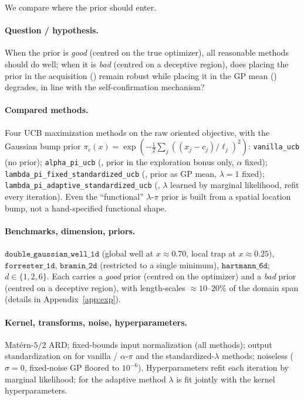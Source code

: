 We compare where the prior should enter. \hfill\Pexp

\paragraph{Question / hypothesis.}
When the prior is \emph{good} (centred on the true optimizer), all reasonable
methods should do well; when it is \emph{bad} (centred on a deceptive region),
does placing the prior in the acquisition (\RIGHT) remain robust while placing it
in the GP mean (\WRONG) degrades, in line with the self-confirmation mechanism?

\paragraph{Compared methods.}
Four UCB maximization methods on the raw oriented objective, with the Gaussian
bump prior $\pi_c(x)=\exp(-\tfrac12\sum_j((x_j-c_j)/\ell_j)^2)$: \texttt{vanilla\_ucb}
(no prior); \texttt{alpha\_pi\_ucb} (\RIGHT, prior in the exploration bonus only,
$\alpha$ fixed); \texttt{lambda\_pi\_fixed\_standardized\_ucb} (\WRONG, prior as
GP mean, $\lambda=1$ fixed); \texttt{lambda\_pi\_adaptive\_standardized\_ucb}
(\WRONG, $\lambda$ learned by marginal likelihood, refit every iteration). Even
the ``functional'' $\lambda$-$\pi$ prior is built from a spatial location bump,
not a hand-specified functional shape.

\paragraph{Benchmarks, dimension, priors.}
$\texttt{double\_gaussian\_well\_1d}$ (global well at $x\approx0.70$, local trap
at $x\approx0.25$), $\texttt{forrester\_1d}$, $\texttt{branin\_2d}$ (restricted
to a single minimum), $\texttt{hartmann\_6d}$; $d\in\{1,2,6\}$. Each carries a
\emph{good} prior (centred on the optimizer) and a \emph{bad} prior (centred on a
deceptive region), with length-scales $\approx10$--$20\%$ of the domain span
(details in Appendix~\ref{app:exp}).

\paragraph{Kernel, transforms, noise, hyperparameters.}
Mat\'ern-$5/2$ ARD; fixed-bounds input normalization (all methods); output
standardization on for vanilla / $\alpha$-$\pi$ and the standardized-$\lambda$
methods; noiseless ($\sigma=0$, fixed-noise GP floored to $10^{-6}$).
Hyperparameters refit each iteration by marginal likelihood; for the adaptive
method $\lambda$ is fit jointly with the kernel hyperparameters.

